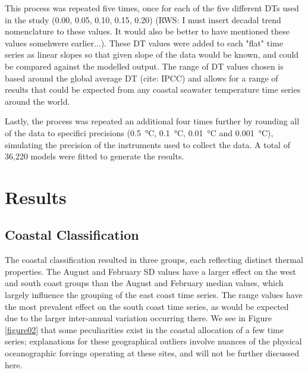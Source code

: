 \documentclass{ametsoc}
\begin{document}
This process was repeated five times, once for each of the five different DTs used in the study (0.00, 0.05, 0.10, 0.15, 0.20) (RWS: I must insert decadal trend nomenclature to these values. It would also be better to have mentioned these values somehwere earlier...). These DT values were added to each "flat" time series as linear slopes so that given slope of the data would be known, and could be compared against the modelled output. The range of DT values chosen is based around the global average DT (cite: IPCC) and allows for a range of results that could be expected from any coastal seawater temperature time series around the world.

Lastly, the process was repeated an additional four times further by rounding all of the data to specifici precisions (\SI{0.5}{\degreeCelsius}, \SI{0.1}{\degreeCelsius}, \SI{0.01}{\degreeCelsius} and \SI{0.001}{\degreeCelsius}), simulating the precision of the instruments used to collect the data. A total of 36,220 models were fitted to generate the results.

\section{Results}

\subsection{Coastal Classification}
The coastal classification resulted in three groups, each reflecting distinct thermal properties. The August and February SD values have a larger effect on the west and south coast groups than the August and February median values, which largely influence the grouping of the east coast time series. The range values have the most prevalent effect on the south coast time series, as would be expected due to the larger inter-annual variation occurring there. We see in Figure \ref{figure02} that some peculiarities exist in the coastal allocation of a few time series; explanations for these geographical outliers involve nuances of the physical oceanographic forcings operating at these sites, and will not be further discussed here.
\end{document}
